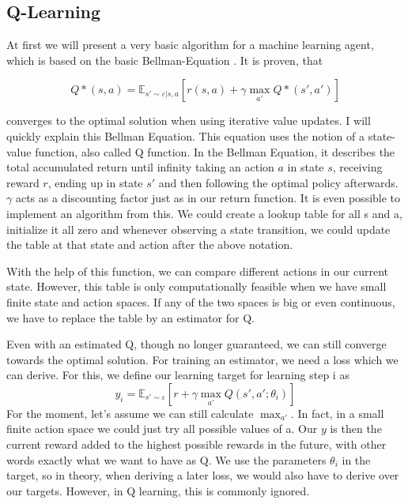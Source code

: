 \documentclass[hyperref,german,beleg]{cgvpub}
\begin{document}
\subsection{Q-Learning}

At first we will present a very basic algorithm for a machine learning agent, which is based on the basic Bellman-Equation \cite{bellmanTheoryDynamicProgramming1954}. It is proven, that

\begin{equation}
Q*(s, a) = \mathbb{E}_{s' \sim \varepsilon | s,a}[r(s,a) + \gamma\max_{a'}Q*(s', a')]
\end{equation}

converges to the optimal solution when using iterative value updates. I will quickly explain this Bellman Equation. This equation uses the notion of a state-value function, also called Q function. In the Bellman Equation, it describes the total accumulated return until infinity taking an action $a$ in state $s$, receiving reward $r$, ending up in state $s'$ and then following the optimal policy afterwards. $\gamma$ acts as a discounting factor just as in our return function. It is even possible to implement an algorithm from this. We could create a lookup table for all s and a, initialize it all zero and whenever observing a state transition, we could update the table at that state and action after the above notation.

With the help of this function, we can compare different actions in our current state. However, this table is only computationally feasible when we have small finite state and action spaces. If any of the two spaces is big or even continuous, we have to replace the table by an estimator for Q.

Even with an estimated Q, though no longer guaranteed, we can still converge towards the optimal solution. For training an estimator, we need a loss which we can derive. For this, we define our learning target for learning step i as
\begin{equation}
y_i = \mathbb{E}_{s' \sim \varepsilon}[r + \gamma \max_{a'}Q(s', a';\theta_{i})]
\end{equation}
For the moment, let's assume we can still calculate $\max_{a'}$. In fact, in a small finite action space we could just try all possible values of a. Our $y$ is then the current reward added to the highest possible rewards in the future, with other words exactly what we want to have as Q. We use the parameters $\theta_{i}$ in the target, so in theory, when deriving a later loss, we would also have to derive over our targets. However, in Q learning, this is commonly ignored.
\end{document}
